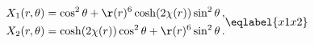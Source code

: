 \begin{equation}
\begin{split}
X_1(r,\theta)&=\cos^2\theta+\r(r)^6\cosh(2\chi(r))\sin^2\theta\,,\\
X_2(r,\theta)&=\cosh(2\chi(r))\cos^2\theta+\r(r)^6\sin^2\theta\,.
\end{split}
\eqlabel{x1x2}
\end{equation}

